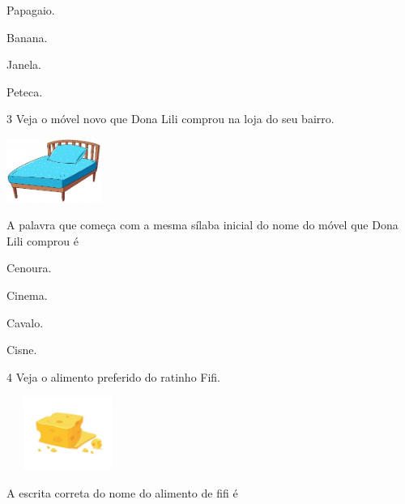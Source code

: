\begin{escolha}
\item Papagaio.

\item Banana.

\item Janela.

\item Peteca.
\end{escolha}

\num{3} Veja o móvel novo que Dona Lili comprou na loja do seu bairro.

\includegraphics[width=1.22293in,height=0.81839in]{media/image140.jpeg}


A palavra que começa com a mesma sílaba inicial do nome do móvel que Dona Lili comprou é

\begin{escolha}
\item Cenoura.

\item Cinema.

\item Cavalo.

\item Cisne.
\end{escolha}

\num{4} Veja o alimento preferido do ratinho Fifi.

\includegraphics[width=1.56736in,height=0.94861in]{media/image141.jpeg}


A escrita correta do nome do alimento de fifi é

